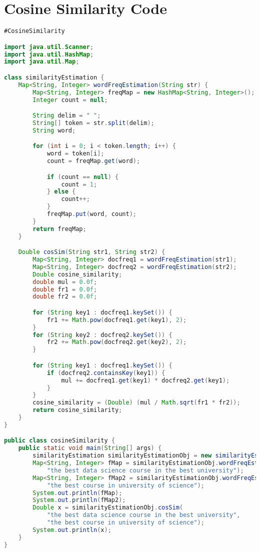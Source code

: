 \documentclass{article}
\begin{document}
\section*{Cosine Similarity Code}
\begin{lstlisting}[language=Java, caption=Cosine Similarity Implementation]
#CosineSimilarity

import java.util.Scanner;
import java.util.HashMap;
import java.util.Map;

class similarityEstimation {
    Map<String, Integer> wordFreqEstimation(String str) {
        Map<String, Integer> freqMap = new HashMap<String, Integer>();
        Integer count = null;

        String delim = " ";
        String[] token = str.split(delim);
        String word;

        for (int i = 0; i < token.length; i++) {
            word = token[i];
            count = freqMap.get(word);

            if (count == null) {
                count = 1;
            } else {
                count++;
            }
            freqMap.put(word, count);
        }
        return freqMap;
    }

    Double cosSim(String str1, String str2) {
        Map<String, Integer> docfreq1 = wordFreqEstimation(str1);
        Map<String, Integer> docfreq2 = wordFreqEstimation(str2);
        Double cosine_similarity;
        double mul = 0.0f;
        double fr1 = 0.0f;
        double fr2 = 0.0f;

        for (String key1 : docfreq1.keySet()) {
            fr1 += Math.pow(docfreq1.get(key1), 2);
        }
        for (String key2 : docfreq2.keySet()) {
            fr2 += Math.pow(docfreq2.get(key2), 2);
        }

        for (String key1 : docfreq1.keySet()) {
            if (docfreq2.containsKey(key1)) {
                mul += docfreq1.get(key1) * docfreq2.get(key1);
            }
        }
        cosine_similarity = (Double) (mul / Math.sqrt(fr1 * fr2));
        return cosine_similarity;
    }
}

public class cosineSimilarity {
    public static void main(String[] args) {
        similarityEstimation similarityEstimationObj = new similarityEstimation();
        Map<String, Integer> fMap = similarityEstimationObj.wordFreqEstimation(
            "the best data science course in the best university");
        Map<String, Integer> fMap2 = similarityEstimationObj.wordFreqEstimation(
            "the best course in university of science");
        System.out.println(fMap);
        System.out.println(fMap2);
        Double x = similarityEstimationObj.cosSim(
            "the best data science course in the best university",
            "the best course in university of science");
        System.out.println(x);
    }
}
\end{lstlisting}
\end{document}
